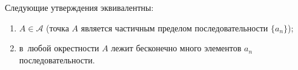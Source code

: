  Следующие утверждения эквивалентны:

\begin{enumerate}
\item $A\in\mathscr A$ (точка $A$ является частичным пределом последовательности $\{a_n\}$);

\item в~любой окрестности $A$ лежит бесконечно много элементов $a_n$ последовательности.
\end{enumerate}
